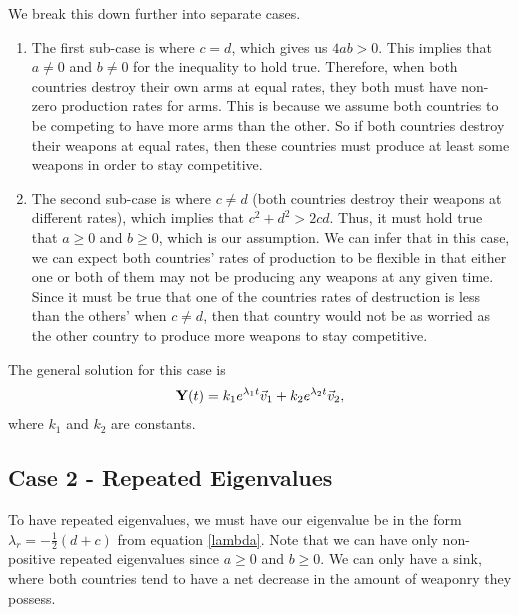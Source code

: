 We break this down further into separate cases.
	\begin{enumerate}
 		\item The first sub-case is where $c = d$, which gives us $4ab > 0$. This implies that $a \ne 0$ and $b \ne 0$ for the inequality to hold true. Therefore, when both countries destroy their own arms at equal rates, they both must have non-zero production rates for arms. This is because we assume both countries to be competing to have more arms than the other. So if both countries destroy their weapons at equal rates, then these countries must produce at least some weapons in order to stay competitive.
		\item The second sub-case is where $c \ne d$ (both countries destroy their weapons at different rates), which implies that $c^2 + d^2 > 2cd$. Thus, it must hold true that $a\ge 0$ and $b \ge 0$, which is our assumption. We can infer that in this case, we can expect both countries' rates of production to be flexible in that either one or both of them may not be producing any weapons at any given time. Since it must be true that one of the countries rates of destruction is less than the others' when $c \ne d$, then that country would not be as worried as the other country to produce more weapons to stay competitive.
	\end{enumerate}
The general solution for this case is 
	\begin{align}
	\bold{Y}(t) = k_1 e^{\lambda_1 t}\vec{v}_1 + k_2 e^{\lambda_2 t}\vec{v}_2,
	\end{align}
where $k_1$ and $k_2$ are constants.

\subsection{Case 2 - Repeated Eigenvalues}

To have repeated eigenvalues, we must have our eigenvalue be in the form $\lambda_r = -\frac{1}{2}(d + c)$ from equation \eqref{lambda}. Note that we can have only non-positive repeated eigenvalues since $a\ge0$ and $b\ge0$.
We can only have a sink, where both countries tend to have a net decrease in the amount of weaponry they possess.

